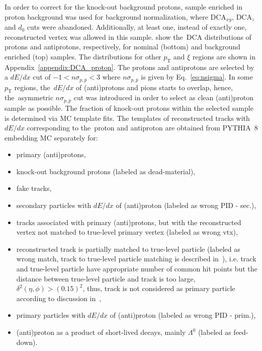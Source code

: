 In order to correct for the knock-out background protons, sample enriched in proton background  was used for background normalization, where $\textrm{DCA}_{xy}$, $\textrm{DCA}_z$ and $d_0$ cuts were abandoned. Additionally, at least one, instead of exactly one,  reconstructed vertex was allowed in this sample.   show the~$\textrm{DCA}$ distributions of protons and antiprotons, respectively, for  nominal (bottom) and background enriched (top) samples. The distributions for other $p_\textrm{T}$ and $\xi$ regions are shown in Appendix~\ref{appendix:DCA_proton}.
The protons and antiprotons are selected by a $dE/dx$ cut of $-1 < n\sigma_{p,\bar{p}} < 3$ where $n\sigma_{p,\bar{p}}$ is given by Eq.~\eqref{eq:nsigma}. In some $p_\textrm{T}$ regions, the~$dE/dx$ of (anti)protons and pions
starts to overlap, hence, the~asymmetric $n\sigma_{p,\bar{p}}$ cut was introduced in order to select as clean (anti)proton sample as possible.
The fraction of knock-out protons within the selected sample is determined via \ac{MC} template fits. The templates of reconstructed tracks with $dE/dx$ corresponding to the~proton and antiproton are obtained from PYTHIA~8 embedding \ac{MC} separately for:
\begin{itemize}
	\item primary (anti)protons,
	\item knock-out background protons (labeled as dead-material),
	\item fake tracks,
	\item secondary particles with $dE/dx$ of (anti)proton (labeled as wrong PID - sec.),
	\item tracks associated with primary (anti)protons, but with the reconstructed vertex  not matched to true-level primary vertex (labeled as wrong vtx),
	\item reconstructed track is partially matched to true-level particle (labeled as wrong match, track to true-level particle matching is described in~\cite{supplementaryNote}), i.e.  track and true-level particle have appropriate number of common hit points but the distance between true-level particle and track is too large, $\delta^2\left(\eta,\phi\right)>\left(0.15\right)^2$, thus, track is not considered as primary particle according to discussion in~\cite{supplementaryNote}, 
	\item primary particles with $dE/dx$ of (anti)proton (labeled as wrong PID - prim.),
	\item (anti)proton as a product of short-lived decays, mainly $\Lambda^0$ (labeled as feed-down).
\end{itemize}



